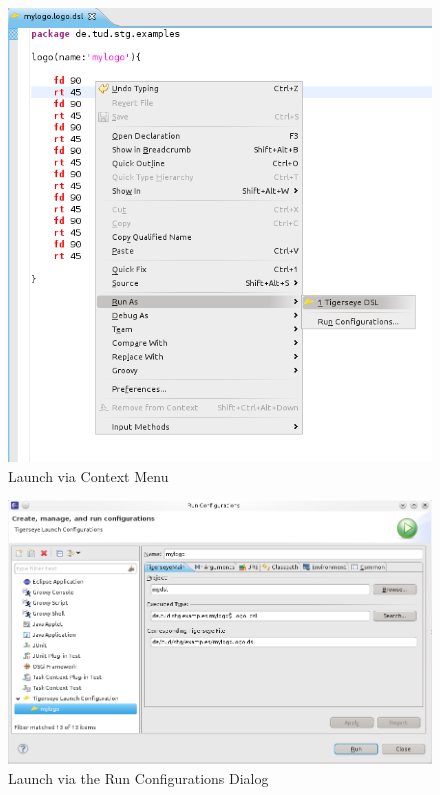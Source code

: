 \documentclass[article,colorback,accentcolor=tud4c]{tudreport}
\begin{document}
	\begin{figure}
	  \centering
	  \includegraphics[scale=0.5]{./pics/launch_shortcut.png}
	  \caption{Launch via Context Menu}
	  \label{fig:launch_shortcut}
	\end{figure}

	\begin{figure}
	  \centering
	  \includegraphics[scale=.5]{./pics/launch_run_configurations_dialog.png}
	  \caption{Launch via the Run Configurations Dialog}
	  \label{fig:launch_run_configurations_dialog}
	\end{figure}
\end{document}
